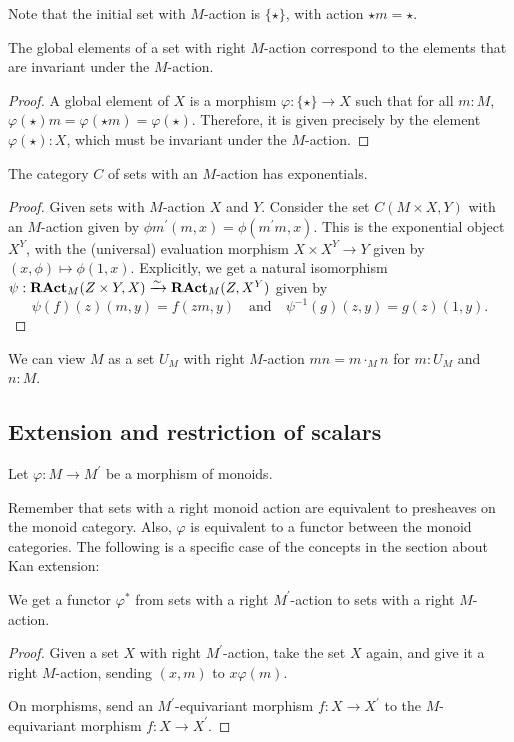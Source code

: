 Note that the initial set with $ M $-action is $ \{ \star \} $, with action $ \star m = \star $.

\begin{lemma}\label{lem:global-action-elements}
  The global elements of a set with right $ M $-action correspond to the elements that are invariant under the $ M $-action.
\end{lemma}
\begin{proof}
  A global element of $ X $ is a morphism $ \varphi: \{ \star \} \to X $ such that for all $ m: M $, $ \varphi(\star)m = \varphi(\star m) = \varphi(\star) $. Therefore, it is given precisely by the element $ \varphi(\star): X $, which must be invariant under the $ M $-action.
\end{proof}

\begin{lemma}
  The category $ C $ of sets with an $ M $-action has exponentials.
\end{lemma}
\begin{proof}
  Given sets with $ M $-action $ X $ and $ Y $. Consider the set $ C(M \times X, Y) $ with an $ M $-action given by $ \phi m^\prime(m, x) = \phi(m^\prime m, x) $. This is the exponential object $ X^Y $, with the (universal) evaluation morphism $ X \times X^Y \to Y $ given by $ (x, \phi) \mapsto \phi(1, x) $. Explicitly, we get a natural isomorphism $ \psi: \mathbf{RAct}_{M}(Z \times Y, X) \xrightarrow \sim \mathbf{RAct}_{M}(Z, X^Y) $ given by
  \[ \psi(f)(z)(m, y) = f(z m, y) \quad \text{and} \quad \psi^{-1}(g)(z, y) = g(z)(1, y). \]
\end{proof}

\begin{definition}
  We can view $ M $ as a set $ U_M $ with right $ M $-action $ m n = m \cdot_M n $ for $ m: U_M $ and $ n: M $.
\end{definition}

\subsection{Extension and restriction of scalars}

Let $ \varphi: M \to M^\prime $ be a morphism of monoids.

Remember that sets with a right monoid action are equivalent to presheaves on the monoid category. Also, $ \varphi $ is equivalent to a functor between the monoid categories. The following is a specific case of the concepts in the section about Kan extension:

\begin{lemma}
  We get a  functor $ \varphi^* $ from sets with a right $ M^\prime $-action to sets with a right $ M $-action.
\end{lemma}
\begin{proof}
  Given a set $ X $ with right $ M^\prime $-action, take the set $ X $ again, and give it a right $ M $-action, sending $ (x, m) $ to $ x \varphi(m) $.

  On morphisms, send an $ M^\prime $-equivariant morphism $ f: X \to X^\prime $ to the $ M $-equivariant morphism $ f: X \to X^\prime $.
\end{proof}


